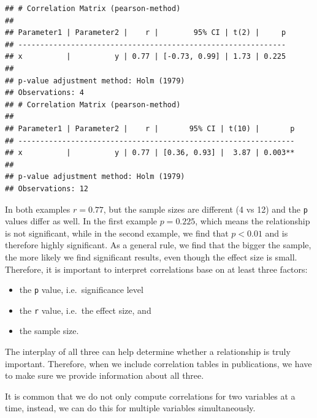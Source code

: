 \documentclass[
]{book}
\begin{document}
\begin{verbatim}
## # Correlation Matrix (pearson-method)
## 
## Parameter1 | Parameter2 |    r |        95% CI | t(2) |     p
## -------------------------------------------------------------
## x          |          y | 0.77 | [-0.73, 0.99] | 1.73 | 0.225
## 
## p-value adjustment method: Holm (1979)
## Observations: 4
## # Correlation Matrix (pearson-method)
## 
## Parameter1 | Parameter2 |    r |       95% CI | t(10) |       p
## ---------------------------------------------------------------
## x          |          y | 0.77 | [0.36, 0.93] |  3.87 | 0.003**
## 
## p-value adjustment method: Holm (1979)
## Observations: 12
\end{verbatim}

In both examples \(r = 0.77\), but the sample sizes are different (4 vs 12) and the \texttt{p} values differ as well. In the first example \(p = 0.225\), which means the relationship is not significant, while in the second example, we find that \(p < 0.01\) and is therefore highly significant. As a general rule, we find that the bigger the sample, the more likely we find significant results, even though the effect size is small. Therefore, it is important to interpret correlations base on at least three factors:

\begin{itemize}
\item
  the \texttt{p} value, i.e.~significance level
\item
  the \texttt{r} value, i.e.~the effect size, and
\item
  the sample size.
\end{itemize}

The interplay of all three can help determine whether a relationship is truly important. Therefore, when we include correlation tables in publications, we have to make sure we provide information about all three.

It is common that we do not only compute correlations for two variables at a time, instead, we can do this for multiple variables simultaneously.
\end{document}

